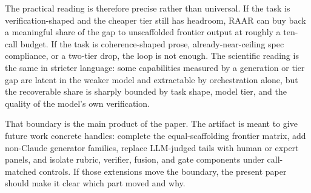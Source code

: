 \documentclass[journal]{IEEEtran}
\newcommand{\method}{RAAR}
\begin{document}
The practical reading is therefore precise rather than universal. If the
task is verification-shaped and the cheaper tier still has headroom,
\method{} can buy back a meaningful share of the gap to unscaffolded
frontier output at roughly a ten-call budget. If the task is coherence-shaped prose, already-near-ceiling
spec compliance, or a two-tier drop, the loop is not enough. The scientific
reading is the same in stricter language: some capabilities measured by a
generation or tier gap are latent in the weaker model and extractable by
orchestration alone, but the recoverable share is sharply bounded by task
shape, model tier, and the quality of the model's own verification.

That boundary is the main product of the paper. The artifact is meant to give
future work concrete handles: complete the equal-scaffolding frontier matrix,
add non-Claude generator families, replace LLM-judged tails with human or
expert panels, and isolate rubric, verifier, fusion, and gate components under
call-matched controls. If those extensions move the boundary, the present
paper should make it clear which part moved and why.
\end{document}
